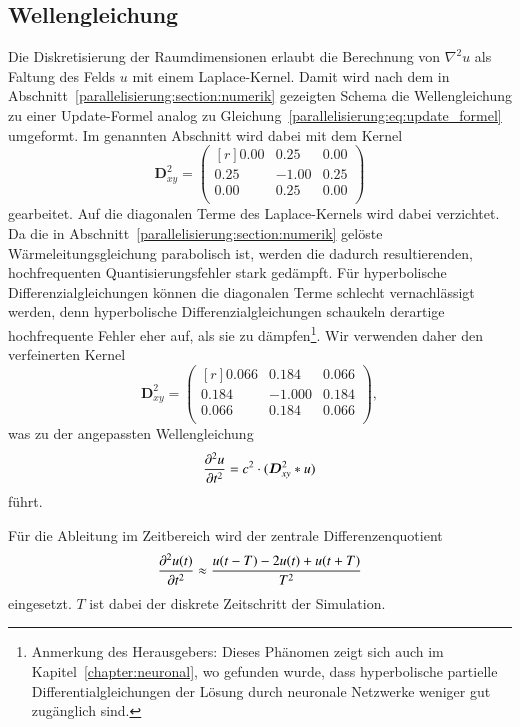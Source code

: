 \subsection{Wellengleichung\label{particles:section:simulation:wellengleichung}}
Die Diskretisierung der Raumdimensionen erlaubt die Berechnung von $\nabla^2 u$ als Faltung des Felds $u$ mit einem Laplace-Kernel.
%
Damit wird nach dem in Abschnitt~\ref{parallelisierung:section:numerik} gezeigten Schema die Wellengleichung zu einer Update-Formel analog zu Gleichung~\eqref{parallelisierung:eq:update_formel} umgeformt.
Im genannten Abschnitt wird dabei mit dem Kernel
\[
    \boldsymbol{D}_{xy}^2
    =
    \begin{pmatrix*}[r]
        0.00 &  0.25 & 0.00\\
        0.25 & -1.00 & 0.25\\
        0.00 &  0.25 & 0.00\\
    \end{pmatrix*}
\]
gearbeitet.
Auf die diagonalen Terme des Laplace-Kernels wird dabei verzichtet. 
Da die in Abschnitt~\ref{parallelisierung:section:numerik} gelöste Wärmeleitungsgleichung parabolisch ist, werden die dadurch resultierenden, hochfrequenten Quantisierungsfehler stark gedämpft.
%
Für hyperbolische Differenzialgleichungen können die diagonalen Terme schlecht vernachlässigt werden, denn hyperbolische Differenzialgleichungen schaukeln derartige hochfrequente Fehler eher auf, als sie zu dämpfen\footnote{%
Anmerkung des Herausgebers: Dieses Phänomen zeigt sich auch im
Kapitel~\ref{chapter:neuronal}, wo gefunden wurde, dass hyperbolische
partielle Differentialgleichungen der Lösung durch neuronale Netzwerke
weniger gut zugänglich sind.}.
Wir verwenden daher den verfeinerten Kernel
\[
    \boldsymbol{D}^2_{xy} = 
    \begin{pmatrix*}[r]
        0.066 &  0.184 & 0.066\\
        0.184 & -1.000 & 0.184\\
        0.066 &  0.184 & 0.066\\
    \end{pmatrix*},
\]
was zu der angepassten Wellengleichung 
\[
    \frac{\d^2 u}{\d t^2} = c^2 \cdot (\boldsymbol{D}^2_{xy} * u)
\]
führt.

Für die Ableitung im Zeitbereich wird der zentrale Differenzenquotient
%
%
\[
    \frac{\d^2 u(t)}{\d t^2} \approx \frac{u(t-T) - 2u(t) + u(t+T)}{T^2}
\]
eingesetzt.
$T$ ist dabei der diskrete Zeitschritt der Simulation.

